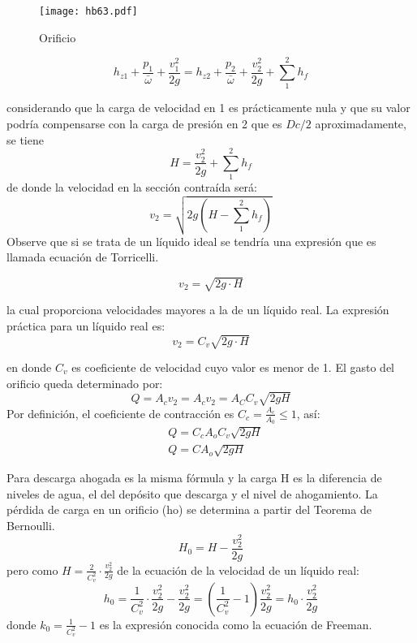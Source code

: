     \begin{figure}[h!]
    \centering
      \texttt{[image: hb63.pdf]}
      \caption{Orificio}
      \label{hb63}
    \end{figure}
    
    \begin{equation*}
        h_{z1} + \frac{p_1}{\bar{\omega}} + \frac{v_1^2}{2g} = h_{z2} + \frac{p_2}{\bar{\omega}} + \frac{v_2^2}{2g} + \sum_1^2 h_f
    \end{equation*}
    
    considerando que la carga de velocidad en 1 es prácticamente nula y que su valor podría compensarse con la carga de presión en 2 que es $Dc/2$ aproximadamente, se
    tiene
    \begin{equation*}
        H = \frac{v_2^2}{2g} +\sum_1^2 h_f
    \end{equation*}
    de donde la velocidad en la sección contraída será:
    \begin{equation*}
        v_2 = \sqrt{2g\left(H -\sum_1^2 h_f\right)}
    \end{equation*}
    Observe que si se trata de un líquido ideal se tendría una expresión que es llamada ecuación de Torricelli.
    
    \begin{equation*}
        v_2 =\sqrt{2g\cdot H}
    \end{equation*}
    
    la cual proporciona velocidades mayores a la de un líquido real. La expresión práctica para un líquido real es:
    \begin{equation*}
        v_2 = C_v \sqrt{2g\cdot H}
    \end{equation*}
    
    en donde $C_v$ es coeficiente de velocidad cuyo valor es menor de 1.
    El gasto del orificio queda determinado por:
    \begin{equation*}
        Q = A_cv_2 = A_c v_2 = A_C C_v \sqrt{2gH}
    \end{equation*}
    Por definición, el coeficiente de contracción es $C_c= \frac{A_c}{A_0}\leq 1$, así:
    \begin{align*}
        &Q = C_c A_o C_v \sqrt{2gH}\\
        &Q = CA_o \sqrt{2gH}
    \end{align*}
    
    
    Para descarga ahogada es la misma fórmula y la carga H es la diferencia de niveles de agua, el del depósito que descarga y el nivel de ahogamiento.
    La pérdida de carga en un orificio (ho) se determina a partir del Teorema de Bernoulli. 
    \begin{equation*}
        H_0 = H - \frac{v_2^2}{2g}
    \end{equation*}
    pero como $H= \frac{2}{C_v^2}\cdot \frac{v_2^2}{2g}$ de la ecuación de la velocidad de un líquido real:
    \begin{equation*}
        h_0 = \frac{1}{C_v^2}\cdot \frac{v_2^2}{2g} - \frac{v_2^2}{2g} = \left(\frac{1}{C_v^2} - 1 \right) \frac{v_2^2}{2g} = h_0\cdot \frac{v_2^2}{2g}
    \end{equation*}
    donde $k_0= \frac{1}{C_v^2}-1$ es la expresión conocida como la ecuación de Freeman.
    
